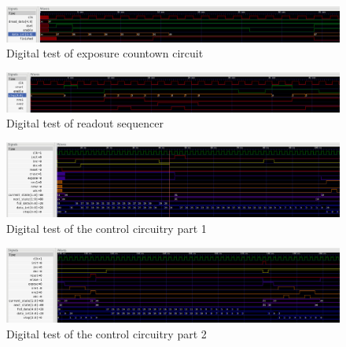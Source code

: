 \begin{figure}[htbp]
  \centering
  \includegraphics[width=\textwidth]{figures/fcdTest}
  \caption{Digital test of exposure countown circuit}
  \label{fig:digfcdtest}
\end{figure}

\begin{figure}[htbp]
  \centering
  \includegraphics[width=\textwidth]{figures/readoutTest}
  \caption{Digital test of readout sequencer}
  \label{fig:digreadouttest}
\end{figure}

\begin{figure}[htbp]
  \centering
  \includegraphics[width=\textwidth]{figures/cameraTest1}
  \caption{Digital test of the control circuitry part 1}
  \label{fig:digcamtest1}
\end{figure}

\begin{figure}[htbp]
  \centering
  \includegraphics[width=\textwidth]{figures/cameraTest2}
  \caption{Digital test of the control circuitry part 2}
  \label{fig:digcamtest2}
\end{figure}